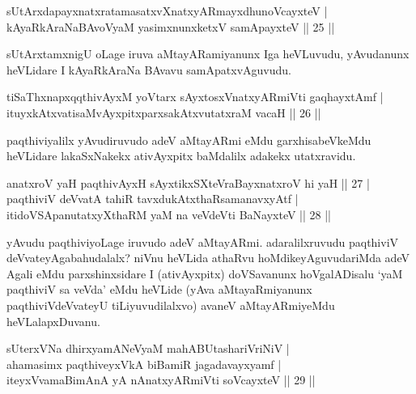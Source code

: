 \begin{shl}
sUtArxdapayxnatxratamasatxvXnatxyARmayxdhunoVcayxteV |\\
kAyaRkAraNaBAvoV\s yaM yasimxnunxketxV samApayxteV \hfill || 25 ||
\end{shl}

\begin{artha}
sUtArxtamxnigU oLage iruva aMtayARamiyanunx Iga heVLuvudu, yAvudanunx heVLidare I kAyaRkAraNa BAvavu samApatxvAguvudu.
\end{artha}


\begin{shl}
tiSaThxnapxqqthivAyxM yoV\s tarx sAyxtosxV\s natxyARmiVti  gaqhayxtAmf |\\
ituyxkAtxvatisaMvAyxpitxparxsakAtxvutatxraM vacaH \hfill || 26 ||
\end{shl}

\begin{artha}
paqthiviyalilx yAvudiruvudo adeV aMtayARmi eMdu garxhisabeVkeMdu heVLidare lakaSxNakekx ativAyxpitx baMdalilx adakekx utatxravidu.
\end{artha}


\begin{shl}
anatxroV yaH paqthivAyxH sAyxtikxSXteVraBayxnatxroV hi yaH \hfill || 27 |\\
paqthiviV deVvatA tahiR tavxdukAtxthaRsamanavxyAtf |\\
itidoVSApanutatxyXthaRM yaM na veVdeVti BaNayxteV \hfill || 28 ||
\end{shl}

\begin{artha}
yAvudu paqthiviyoLage iruvudo adeV aMtayARmi. adaralilxruvudu paqthiviV deVvateyAgabahudalalx? niVnu heVLida athaRvu hoMdikeyAguvuda\-riMda adeV Agali eMdu parxshinxsidare I (ativAyxpitx) doVSavanunx hoVgalADisalu `yaM paqthiviV sa veVda' eMdu heVLide (yAva aMtayaRmiyanunx paqthiviV\-deVvateyU tiLiyuvudilalxvo) avaneV aMtayARmiyeMdu heVLalapxDuvanu.
\end{artha}

\begin{shl}
sUterxVNa dhirxyamANeVyaM mahABUtashariVriNiV |\\
ahamasimx paqthiveyxVkA biBamiR jagadavayxyamf  |\\ 
iteyxVvamaBimAnA yA nAnatxyARmiVti soVcayxteV \hfill || 29 ||
\end{shl}

